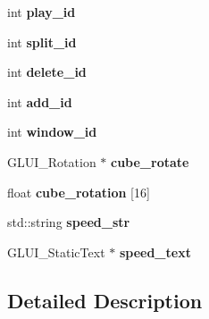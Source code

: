 \begin{DoxyCompactItemize}
\item 
\hypertarget{group___g_l_u_i___v_a_r_i_a_b_l_e_s_ga0996d34a4914587df3bf08bca1536691}{int {\bfseries play\-\_\-id}}\label{group___g_l_u_i___v_a_r_i_a_b_l_e_s_ga0996d34a4914587df3bf08bca1536691}

\item 
\hypertarget{group___g_l_u_i___v_a_r_i_a_b_l_e_s_gafa6fb8089aec47d8344604f0743d9d45}{int {\bfseries split\-\_\-id}}\label{group___g_l_u_i___v_a_r_i_a_b_l_e_s_gafa6fb8089aec47d8344604f0743d9d45}

\item 
\hypertarget{group___g_l_u_i___v_a_r_i_a_b_l_e_s_gadee8725d57487603bcf02cdd5a491663}{int {\bfseries delete\-\_\-id}}\label{group___g_l_u_i___v_a_r_i_a_b_l_e_s_gadee8725d57487603bcf02cdd5a491663}

\item 
\hypertarget{group___g_l_u_i___v_a_r_i_a_b_l_e_s_gacc36f58983d12cbe2b408942f72003b8}{int {\bfseries add\-\_\-id}}\label{group___g_l_u_i___v_a_r_i_a_b_l_e_s_gacc36f58983d12cbe2b408942f72003b8}

\item 
\hypertarget{group___g_l_u_i___v_a_r_i_a_b_l_e_s_ga15742bcca8cec87e63e8a8ac62a0e4b5}{int {\bfseries window\-\_\-id}}\label{group___g_l_u_i___v_a_r_i_a_b_l_e_s_ga15742bcca8cec87e63e8a8ac62a0e4b5}

\item 
\hypertarget{group___g_l_u_i___v_a_r_i_a_b_l_e_s_ga172c526ace4a04ebb3cbdb4ea92b5454}{G\-L\-U\-I\-\_\-\-Rotation $\ast$ {\bfseries cube\-\_\-rotate}}\label{group___g_l_u_i___v_a_r_i_a_b_l_e_s_ga172c526ace4a04ebb3cbdb4ea92b5454}

\item 
\hypertarget{group___g_l_u_i___v_a_r_i_a_b_l_e_s_ga95b5d4a6be82eba3f8c958a44ac42209}{float {\bfseries cube\-\_\-rotation} \mbox{[}16\mbox{]}}\label{group___g_l_u_i___v_a_r_i_a_b_l_e_s_ga95b5d4a6be82eba3f8c958a44ac42209}

\item 
\hypertarget{group___g_l_u_i___v_a_r_i_a_b_l_e_s_ga925238b4af4a967295bc4ebd2067f6d9}{std\-::string {\bfseries speed\-\_\-str}}\label{group___g_l_u_i___v_a_r_i_a_b_l_e_s_ga925238b4af4a967295bc4ebd2067f6d9}

\item 
\hypertarget{group___g_l_u_i___v_a_r_i_a_b_l_e_s_ga8144950a5417d6cc715a137274a8f89e}{G\-L\-U\-I\-\_\-\-Static\-Text $\ast$ {\bfseries speed\-\_\-text}}\label{group___g_l_u_i___v_a_r_i_a_b_l_e_s_ga8144950a5417d6cc715a137274a8f89e}

\end{DoxyCompactItemize}


\subsection{Detailed Description}
